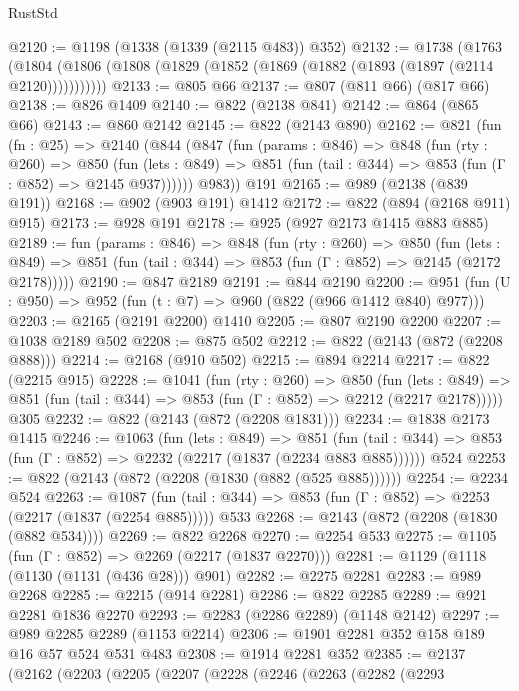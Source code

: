 \begin{lexlean}{RustStd}
\begin{coremodule}
@2120 := @1198 (@1338 (@1339 (@2115 @483)) @352)
@2132 := @1738
    (@1763 (@1804 (@1806 (@1808 (@1829 (@1852 (@1869 (@1882 (@1893 (@1897 (@2114 @2120)))))))))))
@2133 := @805 @66
@2137 := @807 (@811 @66) (@817 @66)
@2138 := @826 @1409
@2140 := @822 (@2138 @841)
@2142 := @864 (@865 @66)
@2143 := @860 @2142
@2145 := @822 (@2143 @890)
@2162 := @821
    (fun (fn : @25) =>
    @2140
      (@844
        (@847
          (fun (params : @846) =>
          @848
            (fun (rty : @260) =>
            @850
              (fun (lets : @849) =>
              @851 (fun (tail : @344) => @853 (fun (Γ : @852) => @2145 @937))))))
        @983))
    @191
@2165 := @989 (@2138 (@839 @191))
@2168 := @902 (@903 @191) @1412
@2172 := @822 (@894 (@2168 @911) @915)
@2173 := @928 @191
@2178 := @925 (@927 @2173 @1415 @883 @885)
@2189 := fun (params : @846) =>
  @848
    (fun (rty : @260) =>
    @850
      (fun (lets : @849) =>
      @851 (fun (tail : @344) => @853 (fun (Γ : @852) => @2145 (@2172 @2178)))))
@2190 := @847 @2189
@2191 := @844 @2190
@2200 := @951 (fun (U : @950) => @952 (fun (t : @7) => @960 (@822 (@966 @1412 @840) @977)))
@2203 := @2165 (@2191 @2200) @1410
@2205 := @807 @2190 @2200
@2207 := @1038 @2189 @502
@2208 := @875 @502
@2212 := @822 (@2143 (@872 (@2208 @888)))
@2214 := @2168 (@910 @502)
@2215 := @894 @2214
@2217 := @822 (@2215 @915)
@2228 := @1041
    (fun (rty : @260) =>
    @850
      (fun (lets : @849) =>
      @851 (fun (tail : @344) => @853 (fun (Γ : @852) => @2212 (@2217 @2178)))))
    @305
@2232 := @822 (@2143 (@872 (@2208 @1831)))
@2234 := @1838 @2173 @1415
@2246 := @1063
    (fun (lets : @849) =>
    @851 (fun (tail : @344) => @853 (fun (Γ : @852) => @2232 (@2217 (@1837 (@2234 @883 @885))))))
    @524
@2253 := @822 (@2143 (@872 (@2208 (@1830 (@882 (@525 @885))))))
@2254 := @2234 @524
@2263 := @1087
    (fun (tail : @344) => @853 (fun (Γ : @852) => @2253 (@2217 (@1837 (@2254 @885)))))
    @533
@2268 := @2143 (@872 (@2208 (@1830 (@882 @534))))
@2269 := @822 @2268
@2270 := @2254 @533
@2275 := @1105 (fun (Γ : @852) => @2269 (@2217 (@1837 @2270)))
@2281 := @1129 (@1118 (@1130 (@1131 (@436 @28))) @901)
@2282 := @2275 @2281
@2283 := @989 @2268
@2285 := @2215 (@914 @2281)
@2286 := @822 @2285
@2289 := @921 @2281 @1836 @2270
@2293 := @2283 (@2286 @2289) (@1148 @2142)
@2297 := @989 @2285 @2289 (@1153 @2214)
@2306 := @1901 @2281 @352 @158 @189 @16 @57 @524 @531 @483
@2308 := @1914 @2281 @352
@2385 := @2137
    (@2162
      (@2203
        (@2205
          (@2207
            (@2228
              (@2246
                (@2263
                  (@2282
                    (@2293

\end{coremodule}
\end{lexlean}
